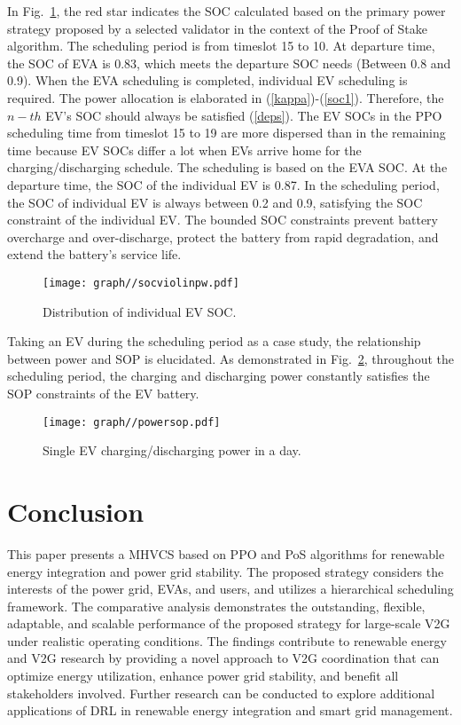 \documentclass[journal,twoside]{IEEEtran}
\begin{document}
In Fig.~\ref{fig:soc509pw}, the red star indicates the SOC calculated based on the primary power strategy proposed by a selected validator in the context of the Proof of Stake algorithm. The scheduling period is from timeslot 15 to 10. At departure time, the SOC of EVA is 0.83, which meets the departure SOC needs (Between 0.8 and 0.9). When the EVA scheduling is completed, individual EV scheduling is required. The power allocation is elaborated in (\ref{kappa})-(\ref{soc1}). Therefore, the $n-th$ EV's SOC should always be satisfied (\ref{deps}). The EV SOCs in the PPO scheduling time from timeslot 15 to 19 are more dispersed than in the remaining time because EV SOCs differ a lot when EVs arrive home for the charging/discharging schedule. The scheduling is based on the EVA SOC. At the departure time, the SOC of the individual EV is 0.87. In the scheduling period, the SOC of individual EV is always between 0.2 and 0.9, satisfying the SOC constraint of the individual EV. The bounded SOC constraints prevent battery overcharge and over-discharge, protect the battery from rapid degradation, and extend the battery's service life.

\begin{figure}[h]
    \centering
    \texttt{[image: graph//socviolinpw.pdf]}
		\caption{Distribution of individual EV SOC. }
		\label{fig:soc509pw}
\end{figure}
 Taking an EV during the scheduling period as a case study, the relationship between power and SOP is elucidated. As demonstrated in Fig.~\ref{fig:powersop}, throughout the scheduling period, the charging and discharging power constantly satisfies the SOP constraints of the EV battery.
\begin{figure}[h]
    \centering
    \texttt{[image: graph//powersop.pdf]}
    \caption{Single EV charging/discharging power in a day.}
    \label{fig:powersop}
\end{figure}
  
\section{Conclusion}
This paper presents a MHVCS based on PPO and PoS algorithms for renewable energy integration and power grid stability. The proposed strategy considers the interests of the power grid, EVAs, and users, and utilizes a hierarchical scheduling framework. The comparative analysis demonstrates the outstanding, flexible, adaptable, and scalable performance of the proposed strategy for large-scale V2G under realistic operating conditions. The findings contribute to renewable energy and V2G research by providing a novel approach to V2G coordination that can optimize energy utilization, enhance power grid stability, and benefit all stakeholders involved. Further research can be conducted to explore additional applications of DRL in renewable energy integration and smart grid management.
\end{document}
